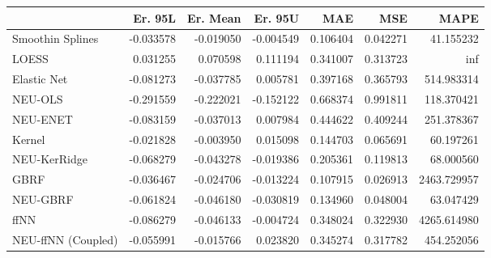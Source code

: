 \begin{tabular}{lrrrrrr}
\toprule
{} &   Er. 95L &  Er. Mean &   Er. 95U &       MAE &       MSE &         MAPE \\
\midrule
Smoothin Splines   & -0.033578 & -0.019050 & -0.004549 &  0.106404 &  0.042271 &    41.155232 \\
LOESS              &  0.031255 &  0.070598 &  0.111194 &  0.341007 &  0.313723 &          inf \\
Elastic Net        & -0.081273 & -0.037785 &  0.005781 &  0.397168 &  0.365793 &   514.983314 \\
NEU-OLS            & -0.291559 & -0.222021 & -0.152122 &  0.668374 &  0.991811 &   118.370421 \\
NEU-ENET           & -0.083159 & -0.037013 &  0.007984 &  0.444622 &  0.409244 &   251.378367 \\
Kernel             & -0.021828 & -0.003950 &  0.015098 &  0.144703 &  0.065691 &    60.197261 \\
NEU-KerRidge       & -0.068279 & -0.043278 & -0.019386 &  0.205361 &  0.119813 &    68.000560 \\
GBRF               & -0.036467 & -0.024706 & -0.013224 &  0.107915 &  0.026913 &  2463.729957 \\
NEU-GBRF           & -0.061824 & -0.046180 & -0.030819 &  0.134960 &  0.048004 &    63.047429 \\
ffNN               & -0.086279 & -0.046133 & -0.004724 &  0.348024 &  0.322930 &  4265.614980 \\
NEU-ffNN (Coupled) & -0.055991 & -0.015766 &  0.023820 &  0.345274 &  0.317782 &   454.252056 \\
\bottomrule
\end{tabular}
